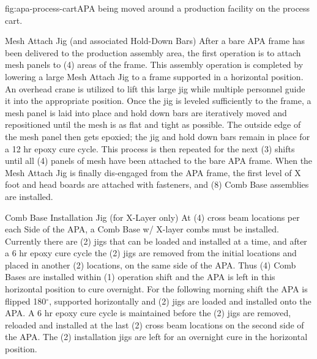 \begin{dunefigure}{fig:apa-process-cart}{APA being moved around a production facility on the process cart.}
\setlength{\fboxsep}{0pt}
\setlength{\fboxrule}{0.5pt}
\end{dunefigure}

Mesh Attach Jig (and associated Hold-Down Bars)
After a bare APA frame has been delivered to the production assembly area, the first operation is to attach mesh panels to (4) areas of the frame.  This assembly operation is completed by lowering a large Mesh Attach Jig to a frame supported in a horizontal position.  An overhead crane is utilized to lift this large jig while multiple personnel guide it into the appropriate position. Once the jig is leveled sufficiently to the frame, a mesh panel is laid into place and hold down bars are iteratively moved and repositioned until the mesh is as flat and tight as possible.  The outside edge of the mesh panel then gets epoxied; the jig and hold down bars remain in place for a 12 hr epoxy cure cycle.  This process is then repeated for the next (3) shifts until all (4) panels of mesh have been attached to the bare APA frame.  When the Mesh Attach Jig is finally dis-engaged from the APA frame, the first level of X foot and head boards are attached with fasteners, and (8) Comb Base assemblies are installed.




Comb Base Installation Jig (for X-Layer only)
At (4) cross beam locations per each Side of the APA, a Comb Base w/ X-layer combs must be installed.  Currently there are (2) jigs that can be loaded and installed at a time, and after a 6 hr epoxy cure cycle the (2) jigs are removed from the initial locations and placed in another (2) locations, on the same side of the APA.  Thus (4) Comb Bases are installed within (1) operation shift and the APA is left in this horizontal position to cure overnight.  For the following morning shift the APA is flipped 180$^\circ$, supported horizontally and (2) jigs are loaded and installed onto the APA.  A 6 hr epoxy cure cycle is maintained before the (2) jigs are removed, reloaded and installed at the last (2) cross beam locations on the second side of the APA.  The (2) installation jigs are left for an overnight cure in the horizontal position.  

